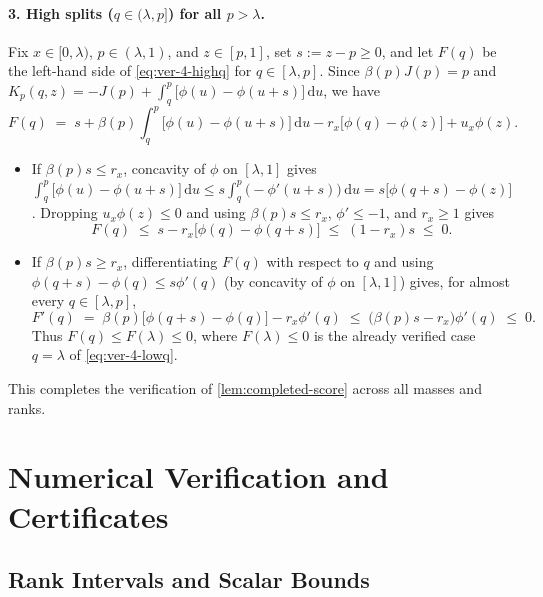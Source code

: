 \documentclass[11pt]{article}
\numberwithin{equation}{section}
\theoremstyle{plain}
\theoremstyle{definition}
\newcommand{\1}{\mathbf{1}}
\begin{document}
\paragraph{3. High splits ($q \in (\lambda, p]$) for all $p > \lambda$.}
Fix $x \in [0, \lambda)$, $p \in (\lambda, 1)$, and $z \in [p, 1]$, set $s := z - p \ge 0$, and let $F(q)$ be the left-hand side of \cref{eq:ver-4-highq} for $q \in [\lambda, p]$. Since $\beta(p)J(p) = p$ and $K_p(q, z) = -J(p) + \int_q^p \bigl[\phi(u) - \phi(u + s)\bigr]\,\mathrm{d}u$, we have
\[
  F(q) \;=\; s + \beta(p)\int_q^p \bigl[\phi(u) - \phi(u + s)\bigr]\,\mathrm{d}u - r_x\bigl[\phi(q) - \phi(z)\bigr] + u_x\phi(z).
\]
\begin{itemize}
  \item If $\beta(p)s \le r_x$, concavity of $\phi$ on $[\lambda, 1]$ gives $\int_q^p \bigl[\phi(u) - \phi(u + s)\bigr]\,\mathrm{d}u \le s\int_q^p \bigl(-\phi'(u + s)\bigr)\,\mathrm{d}u = s\bigl[\phi(q + s) - \phi(z)\bigr]$. Dropping $u_x\phi(z) \le 0$ and using $\beta(p)s \le r_x$, $\phi' \le -1$, and $r_x \ge 1$ gives
  \[
    F(q) \;\le\; s - r_x\bigl[\phi(q) - \phi(q + s)\bigr] \;\le\; (1 - r_x)s \;\le\; 0.
  \]
  \item If $\beta(p)s \ge r_x$, differentiating $F(q)$ with respect to $q$ and using $\phi(q + s) - \phi(q) \le s\phi'(q)$ (by concavity of $\phi$ on $[\lambda, 1]$) gives, for almost every $q \in [\lambda, p]$,
  \[
    F'(q) \;=\; \beta(p)\bigl[\phi(q + s) - \phi(q)\bigr] - r_x\phi'(q) \;\le\; \bigl(\beta(p)s - r_x\bigr)\phi'(q) \;\le\; 0.
  \]
  Thus $F(q) \le F(\lambda) \le 0$, where $F(\lambda) \le 0$ is the already verified case $q = \lambda$ of \cref{eq:ver-4-lowq}.
\end{itemize}
This completes the verification of \cref{lem:completed-score} across all masses and ranks.

\section{Numerical Verification and Certificates}
\label{app:numerical}

\subsection{Rank Intervals and Scalar Bounds}
\label{app:rank-intervals}
\end{document}
